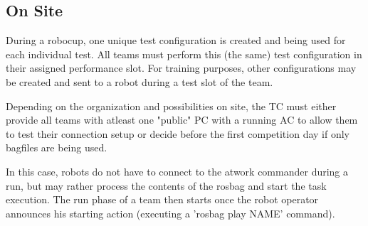 \subsection{On Site}

During a robocup, one unique test configuration is created and being used for each individual test.
All teams must perform this (the same) test configuration in their assigned performance slot.
For training purposes, other configurations may be created and sent to a robot during a test slot of the team.

Depending on the organization and possibilities on site, the TC must either provide all teams with atleast one "public" PC with a running AC to allow them to test their connection setup or decide before the first competition day if only bagfiles are being used.

In this case, robots do not have to connect to the atwork commander during a run, but may rather process the contents of the rosbag and start the task execution.
The run phase of a team then starts once the robot operator announces his starting action (executing a 'rosbag play NAME' command). 



